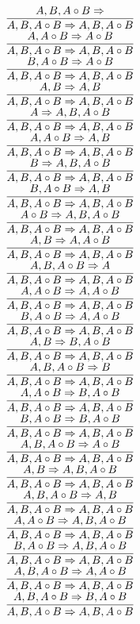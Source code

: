 \documentclass[11pt]{article}
\begin{document}
\begin{center}
\bigskip
\\$\infer{A, B, A\circ B\Rightarrow A, B, A\circ B}{A, B, A\circ B\Rightarrow }$
\bigskip
\\$\infer{A, B, A\circ B\Rightarrow A, B, A\circ B}{A, A\circ B\Rightarrow A\circ B}$
\bigskip
\\$\infer{A, B, A\circ B\Rightarrow A, B, A\circ B}{B, A\circ B\Rightarrow A\circ B}$
\bigskip
\\$\infer{A, B, A\circ B\Rightarrow A, B, A\circ B}{A, B\Rightarrow A, B}$
\bigskip
\\$\infer{A, B, A\circ B\Rightarrow A, B, A\circ B}{A\Rightarrow A, B, A\circ B}$
\bigskip
\\$\infer{A, B, A\circ B\Rightarrow A, B, A\circ B}{A, A\circ B\Rightarrow A, B}$
\bigskip
\\$\infer{A, B, A\circ B\Rightarrow A, B, A\circ B}{B\Rightarrow A, B, A\circ B}$
\bigskip
\\$\infer{A, B, A\circ B\Rightarrow A, B, A\circ B}{B, A\circ B\Rightarrow A, B}$
\bigskip
\\$\infer{A, B, A\circ B\Rightarrow A, B, A\circ B}{A\circ B\Rightarrow A, B, A\circ B}$
\bigskip
\\$\infer{A, B, A\circ B\Rightarrow A, B, A\circ B}{A, B\Rightarrow A, A\circ B}$
\bigskip
\\$\infer{A, B, A\circ B\Rightarrow A, B, A\circ B}{A, B, A\circ B\Rightarrow A}$
\bigskip
\\$\infer{A, B, A\circ B\Rightarrow A, B, A\circ B}{A, A\circ B\Rightarrow A, A\circ B}$
\bigskip
\\$\infer{A, B, A\circ B\Rightarrow A, B, A\circ B}{B, A\circ B\Rightarrow A, A\circ B}$
\bigskip
\\$\infer{A, B, A\circ B\Rightarrow A, B, A\circ B}{A, B\Rightarrow B, A\circ B}$
\bigskip
\\$\infer{A, B, A\circ B\Rightarrow A, B, A\circ B}{A, B, A\circ B\Rightarrow B}$
\bigskip
\\$\infer{A, B, A\circ B\Rightarrow A, B, A\circ B}{A, A\circ B\Rightarrow B, A\circ B}$
\bigskip
\\$\infer{A, B, A\circ B\Rightarrow A, B, A\circ B}{B, A\circ B\Rightarrow B, A\circ B}$
\bigskip
\\$\infer{A, B, A\circ B\Rightarrow A, B, A\circ B}{A, B, A\circ B\Rightarrow A\circ B}$
\bigskip
\\$\infer{A, B, A\circ B\Rightarrow A, B, A\circ B}{A, B\Rightarrow A, B, A\circ B}$
\bigskip
\\$\infer{A, B, A\circ B\Rightarrow A, B, A\circ B}{A, B, A\circ B\Rightarrow A, B}$
\bigskip
\\$\infer{A, B, A\circ B\Rightarrow A, B, A\circ B}{A, A\circ B\Rightarrow A, B, A\circ B}$
\bigskip
\\$\infer{A, B, A\circ B\Rightarrow A, B, A\circ B}{B, A\circ B\Rightarrow A, B, A\circ B}$
\bigskip
\\$\infer{A, B, A\circ B\Rightarrow A, B, A\circ B}{A, B, A\circ B\Rightarrow A, A\circ B}$
\bigskip
\\$\infer{A, B, A\circ B\Rightarrow A, B, A\circ B}{A, B, A\circ B\Rightarrow B, A\circ B}$
\bigskip
\\
\end{center}
\end{document}
